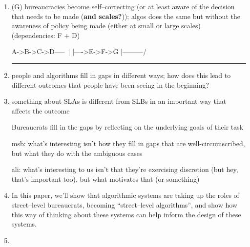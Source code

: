 \documentclass[main]{subfiles}
\begin{document}
\begin{enumerate}
  \item (G) bureaucracies become self--correcting (or at least aware of the decision that needs to be made (\textbf{and scales?})); algos does the same but without the awareness of policy being made (either at small or large scales)
      (dependencies: F + D)


A->B->C->D-----\
|     |---->E->F->G
|---------/
  \par\noindent\rule{\textwidth}{0.5pt}


  \item people and algorithms fill in gaps in different ways; how does this lead to different outcomes that people have been seeing in the beginning?

  \item something about SLAs is different from SLBs in an important way that affects the outcome


  Bureaucrats fill in the gaps by reflecting on the underlying goals of their task

  msb: what's interesting isn't how they fill in gaps that are well-circumscribed, but what they do with the ambiguous cases

  ali: what's interesting to us isn't that they're exercising discretion (but hey, that's important too), but what motivates that (or something)


  \item {In this paper, we'll show that algorithmic systems are taking up the roles of street--level bureaucrats, becoming ``street--level algorithms'', and show how this way of thinking about these systems can help inform the design of these systems.}


  \item {}



\end{enumerate}
\end{document}
